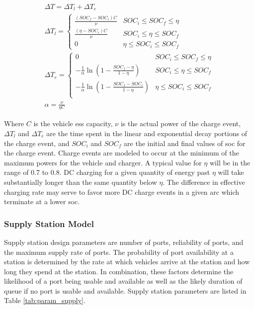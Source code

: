 \begin{gather}
	\Delta T = \Delta T_{l} + \Delta T_{e} \\
	\Delta T_{l} = \begin{cases}
		\frac{(SOC_f - SOC_i) C}{\nu} &  SOC_i \leq SOC_f \leq \eta \\
		\frac{(\eta - SOC_i) C}{\nu} &  SOC_i \leq \eta \leq SOC_f \\
		0 &  \eta \leq SOC_i \leq SOC_f
	\end{cases} \\
	\Delta T_{e} = \begin{cases}
		0 & SOC_i \leq SOC_f \leq \eta \\
		-\frac{1}{\alpha}\ln{\left(1-\frac{SOC_f - \eta}{1-\eta}\right)} &  SOC_i \leq \eta \leq SOC_f \\
		-\frac{1}{\alpha}\ln{\left(1-\frac{SOC_f - SOC_i}{1-\eta}\right)} &  \eta \leq SOC_i \leq SOC_f \\
	\end{cases} \\
	\alpha = \frac{\nu}{\eta C}
\end{gather}

Where $C$ is the vehicle \gls{ess} capacity, $\nu$ is the actual power of the charge event, $\Delta T_l$ and $\Delta T_e$ are the time spent in the linear and exponential decay portions of the charge event, and $SOC_i$ and $SOC_f$ are the initial and final values of \gls{soc} for the charge event. Charge events are modeled to occur at the minimum of the maximum powers for the vehicle and charger. A typical value for $\eta$ will be in the range of 0.7 to 0.8. DC charging for a given quantity of energy past $\eta$ will take substantially longer than the same quantity below $\eta$. The difference in effective charging rate may serve to favor more DC charge events in a given arc which terminate at a lower \gls{soc}.

\subsubsection*{Supply Station Model}

Supply station design parameters are number of ports, reliability of ports, and the maximum supply rate of ports. The probability of port availability at a station is determined by the rate at which vehicles arrive at the station and how long they spend at the station. In combination, these factors determine the likelihood of a port being usable and available as well as the likely duration of queue if no port is usable and available. Supply station parameters are listed in Table \ref{tab:param_supply}.

